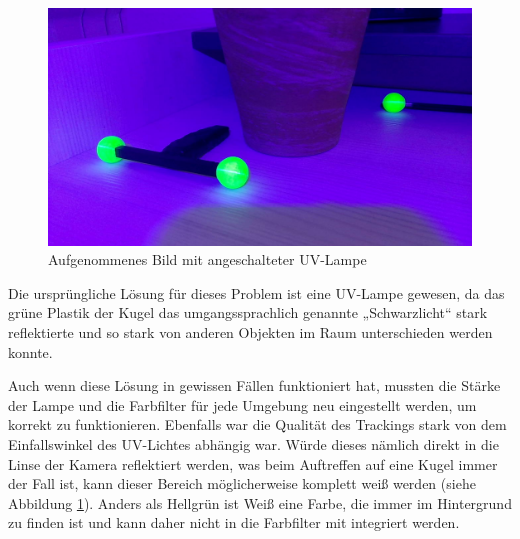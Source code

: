 \documentclass[12pt, ngerman]{article}
\begin{document}
\begin{figure}
  {\setlength{\belowcaptionskip}{-10pt}
    \includegraphics[angle=0,width=\linewidth]{2d-uv-normal.jpg}
    \caption{Aufgenommenes Bild mit angeschalteter UV-Lampe}
    \label{Abb: UV}
  }
\end{figure}
Die ursprüngliche Lösung für dieses Problem ist eine UV-Lampe gewesen, da das grüne Plastik der Kugel das umgangssprachlich genannte „Schwarzlicht“ stark reflektierte und so stark von anderen Objekten im Raum unterschieden werden konnte. 

Auch wenn diese Lösung in gewissen Fällen funktioniert hat, mussten die Stärke der Lampe und die Farbfilter für jede Umgebung neu eingestellt werden, um korrekt zu funktionieren. Ebenfalls war die Qualität des Trackings stark von dem Einfallswinkel des UV-Lichtes abhängig war. Würde dieses nämlich direkt in die Linse der Kamera reflektiert werden, was beim Auftreffen auf eine Kugel immer der Fall ist, kann dieser Bereich möglicherweise komplett weiß werden (siehe Abbildung \ref{Abb: UV}). Anders als Hellgrün ist Weiß eine Farbe, die immer im Hintergrund zu finden ist und kann daher nicht in die Farbfilter mit integriert werden. 
\end{document}
